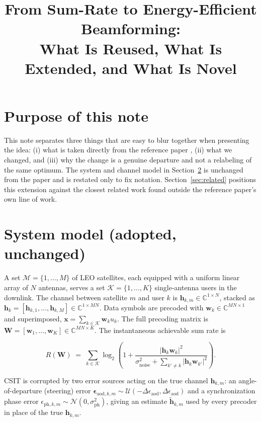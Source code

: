 \documentclass[11pt]{article}
\title{From Sum-Rate to Energy-Efficient Beamforming:\\
       What Is Reused, What Is Extended, and What Is Novel}
\author{}
\date{}
\begin{document}
\maketitle

\section{Purpose of this note}

This note separates three things that are easy to blur together when
presenting the idea: (i) what is taken directly from the reference paper
\cite{Schroder2025}, (ii) what we changed, and (iii) why the change is a
genuine departure and not a relabeling of the same optimum. The system and
channel model in Section~\ref{sec:system} is unchanged from the paper and is
restated only to fix notation. Section~\ref{sec:related} positions this
extension against the closest related work found outside the reference
paper's own line of work.

\section{System model (adopted, unchanged)}
\label{sec:system}

A set $\mathcal{M}=\{1,\dots,M\}$ of LEO satellites, each equipped with a
uniform linear array of $N$ antennas, serves a set $\mathcal{K}=\{1,\dots,K\}$
single-antenna users in the downlink. The channel between satellite $m$ and
user $k$ is $\mathbf{h}_{k,m}\in\mathbb{C}^{1\times N}$, stacked as
$\mathbf{h}_k = [\mathbf{h}_{k,1},\dots,\mathbf{h}_{k,M}] \in
\mathbb{C}^{1\times MN}$. Data symbols are precoded with
$\mathbf{w}_k \in \mathbb{C}^{MN\times 1}$ and superimposed,
$\mathbf{x} = \sum_{k\in\mathcal{K}} \mathbf{w}_k u_k$. The full precoding
matrix is $\mathbf{W} = [\mathbf{w}_1,\dots,\mathbf{w}_K] \in
\mathbb{C}^{MN\times K}$. The instantaneous achievable sum rate is

\begin{equation}
  R(\mathbf{W}) \;=\; \sum_{k\in\mathcal{K}}
  \log_2\!\left(1 + \frac{|\mathbf{h}_k \mathbf{w}_k|^2}
  {\sigma_{\text{noise}}^2 + \sum_{k'\neq k}|\mathbf{h}_k \mathbf{w}_{k'}|^2}\right).
  \label{eq:sumrate}
\end{equation}

CSIT is corrupted by two error sources acting on the true channel
$\mathbf{h}_{k,m}$: an angle-of-departure (steering) error
$\boldsymbol{\epsilon}_{\text{aod},k,m}\sim\mathcal{U}(-\Delta\epsilon_{\text{aod}},
\Delta\epsilon_{\text{aod}})$ and a synchronization phase error
$\epsilon_{\text{ph},k,m}\sim\mathcal{N}(0,\sigma_{\text{ph}}^2)$, giving an
estimate $\tilde{\mathbf{h}}_{k,m}$ used by every precoder in place of the
true $\mathbf{h}_{k,m}$.
\end{document}
